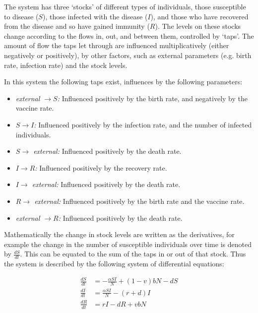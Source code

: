 
The system has three `stocks' of different types of individuals, those
susceptible to disease ($S$), those infected with the disease ($I$), and those
who have recovered from the disease and so have gained immunity ($R$). The
levels on these stocks change according to the flows in, out, and between them,
controlled by `taps'. The amount of flow the taps let through are influenced
multiplicatively (either negatively or positively), by other factors, such as
external parameters (e.g. birth rate, infection rate) and the stock levels.

In this system the following taps exist, influences by the following parameters:

\begin{itemize}
  \item \textit{external $\rightarrow S$:} Influenced positively by the birth
  rate, and negatively by the vaccine rate.
  \item \textit{$S \rightarrow I$:} Influenced positively by the infection rate,
  and the number of infected individuals.
  \item \textit{$S \rightarrow$ external:} Influenced positively by the death
  rate.
  \item \textit{$I \rightarrow R$:} Influenced positively by the recovery rate.
  \item \textit{$I \rightarrow$ external:} Influenced positively by the death
  rate.
  \item \textit{$R \rightarrow$ external:} Influenced positively by the birth
  rate and the vaccine rate.
  \item \textit{external $\rightarrow R$:} Influenced positively by the death
  rate.
\end{itemize}

Mathematically the change in stock levels are written as the derivatives, for
example the change in the number of susceptible individuals over time is denoted
by $\frac{dS}{dt}$. This can be equated to the sum of the taps in or out of that
stock. Thus the system is described by the following system of differential
equations:

\begin{align}
\frac{dS}{dt} &= -\frac{\alpha SI}{N} + (1 - v)bN - dS \label{eqn:dS}\\
\frac{dI}{dt} &= \frac{\alpha SI}{N} - (r + d)I \label{eqn:dI}\\
\frac{dR}{dt} &= rI - dR + vbN \label{eqn:dR}
\end{align}

